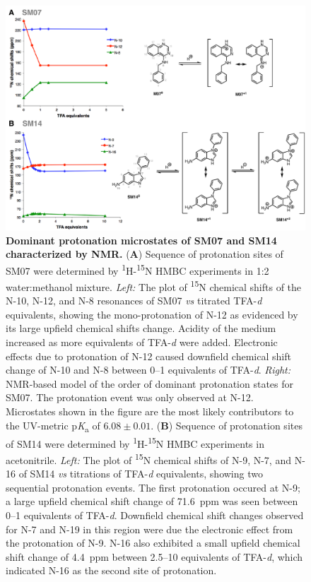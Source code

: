 \documentclass[9pt,lineno]{elife}
\newcommand{\pKa}{p\textit{K}\textsubscript{a}}
\begin{document}
\begin{figure}
\begin{center}
\includegraphics[width=1.00\linewidth]{figures/NMR_microstates_figure.pdf}
\caption{{\bf Dominant protonation microstates of SM07 and SM14 characterized by NMR.}  
(\textbf{A}) Sequence of protonation sites of SM07 were determined by \textsuperscript{1}H-\textsuperscript{15}N HMBC experiments in 1:2 water:methanol mixture. 
\textit{Left:} The plot of \textsuperscript{15}N chemical shifts of the N-10, N-12, and N-8 resonances of SM07 \textit{vs} titrated TFA-\textit{d} equivalents, showing the mono-protonation of N-12 as evidenced by its large upfield chemical shifts change. 
Acidity of the medium increased as more equivalents of TFA-\textit{d} were added. 
Electronic effects due to protonation of N-12 caused downfield chemical shift change of N-10 and N-8 between 0--1 equivalents of TFA-\textit{d}. 
\textit{Right:} NMR-based model of the order of dominant protonation states for SM07. 
The protonation event was only observed at N-12.
Microstates shown in the figure are the most likely contributors to the UV-metric \pKa{} of $6.08 \pm 0.01$.
(\textbf{B}) Sequence of protonation sites of SM14 were determined by \textsuperscript{1}H-\textsuperscript{15}N HMBC experiments in acetonitrile. 
\textit{Left:} The plot of  \textsuperscript{15}N chemical shifts of N-9, N-7, and N-16 of SM14 \textit{vs} titrations of TFA-\textit{d} equivalents, showing two sequential protonation events. 
The first protonation occured at N-9; a large upfield chemical shift change of 71.6~ppm was seen between 0--1 equivalents of TFA-\textit{d}. 
Downfield chemical shift changes observed for N-7 and N-19 in this region were due the electronic effect from the protonation of N-9. N-16 also exhibited a small upfield chemical shift change of 4.4~ppm between 2.5--10 equivalents of TFA-\textit{d}, which indicated N-16 as the second site of protonation. 
}
\end{center}
\end{figure}
\end{document}
